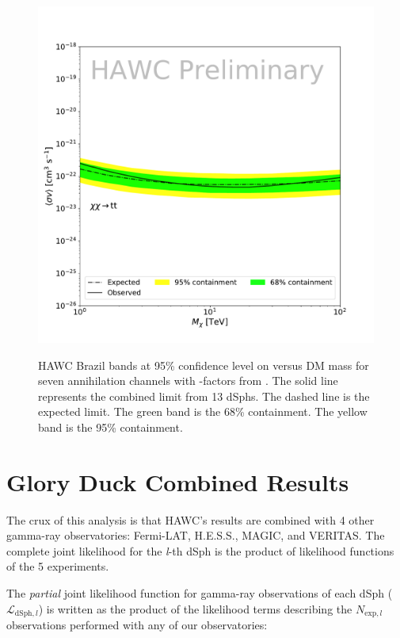 \begin{figure}[ht]
{    \includegraphics[scale=0.21]{figures/glory_duck/hawc/GD_BrazilBand_tt.pdf}
    }
    \caption{HAWC Brazil bands at 95\% confidence level on \sv versus DM mass for seven annihilation channels with \J-factors from \GS \cite{Geringer-Sameth:2014yza}. The solid line represents the combined limit from 13 dSphs. The dashed line is the expected limit. The green band is the 68\% containment. The yellow band is the 95\% containment.}
\label{fig:hawc_brazil_band}
\end{figure}

\section{Glory Duck Combined Results}\label{sec:results}

The crux of this analysis is that HAWC's results are combined with 4 other gamma-ray observatories: Fermi-LAT, H.E.S.S., MAGIC, and VERITAS.
The complete joint likelihood for the \emph{l}-th dSph is the product of likelihood functions of the 5 experiments.


The \textit{partial} joint likelihood function for gamma-ray observations of each dSph ($\mathcal{L}_{\text{dSph},l}$) is written as the product of the likelihood terms describing the $N_{\text{exp},l}$ observations performed with any of our observatories:
\GDjointLLH

